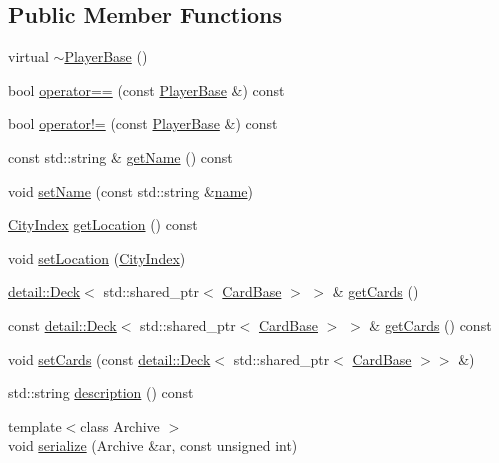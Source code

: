 \subsection*{Public Member Functions}
\begin{DoxyCompactItemize}
\item 
virtual \hyperlink{classpan_1_1_player_base_ab2f4c99f8580f417a2f79534048ebc22}{$\sim$\+Player\+Base} ()
\item 
bool \hyperlink{classpan_1_1_player_base_a6af9e045f23aae67188ec154202d8048}{operator==} (const \hyperlink{classpan_1_1_player_base}{Player\+Base} \&) const
\item 
bool \hyperlink{classpan_1_1_player_base_a95f1b22c858ea2ceefbcff6a52c7312a}{operator!=} (const \hyperlink{classpan_1_1_player_base}{Player\+Base} \&) const
\item 
const std\+::string \& \hyperlink{classpan_1_1_player_base_a427d73fde6596033fbe0ebd511d1e7c1}{get\+Name} () const
\item 
void \hyperlink{classpan_1_1_player_base_a7c8cf80013d7ffa5139a33e3a5d8d395}{set\+Name} (const std\+::string \&\hyperlink{classpan_1_1_player_base_a95bf8887210003d8780dec9d84743a64}{name})
\item 
\hyperlink{namespacepan_afaed28aa6603153dcc062a028602d697}{City\+Index} \hyperlink{classpan_1_1_player_base_aa4bc65b9e86fa2b506f5191be751cfea}{get\+Location} () const
\item 
void \hyperlink{classpan_1_1_player_base_ad124348adae23b1d6b85fe1359b7c752}{set\+Location} (\hyperlink{namespacepan_afaed28aa6603153dcc062a028602d697}{City\+Index})
\item 
\hyperlink{classpan_1_1detail_1_1_deck}{detail\+::\+Deck}$<$ std\+::shared\+\_\+ptr$<$ \hyperlink{classpan_1_1_card_base}{Card\+Base} $>$ $>$ \& \hyperlink{classpan_1_1_player_base_ada4d9050732037e7436cb78244ec177b}{get\+Cards} ()
\item 
const \hyperlink{classpan_1_1detail_1_1_deck}{detail\+::\+Deck}$<$ std\+::shared\+\_\+ptr$<$ \hyperlink{classpan_1_1_card_base}{Card\+Base} $>$ $>$ \& \hyperlink{classpan_1_1_player_base_a8c23e4d5910f85c0e942f3b0819743af}{get\+Cards} () const
\item 
void \hyperlink{classpan_1_1_player_base_a94e33fc8f12381165320363b2886b7f6}{set\+Cards} (const \hyperlink{classpan_1_1detail_1_1_deck}{detail\+::\+Deck}$<$ std\+::shared\+\_\+ptr$<$ \hyperlink{classpan_1_1_card_base}{Card\+Base} $>$$>$ \&)
\item 
std\+::string \hyperlink{classpan_1_1_player_base_a9b3e10457a0d749d97d91b6461882ac6}{description} () const
\item 
{\footnotesize template$<$class Archive $>$ }\\void \hyperlink{classpan_1_1_player_base_a8b884015c320a552d9021e507285d392}{serialize} (Archive \&ar, const unsigned int)
\end{DoxyCompactItemize}
